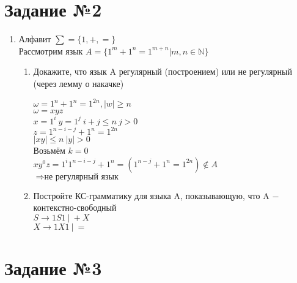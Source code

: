 \documentclass{article}
\begin{document}
    \section*{\huge{Задание №2}}
    
        \begin{enumerate}
            \LARGE
            \item Алфавит $\sum = \{ 1,+,= \}$ \\ Рассмотрим язык $A = \{ 1^m + 1^n = 1^{m+n}|m,n \in \mathbb{N} \}$
                \begin{enumerate}
                    \item Докажите, что язык A регулярный (построением) или не регулярный (через лемму о накачке) \\
                    
                        \begin{center}
                            $\omega = 1^n + 1^n = 1^{2n}, |w| \geq n$ \\
                            $\omega = xyz$ \\
                            $x = 1^i \  y = 1^j \  i + j \leq n \  j > 0$ \\
                            $z = 1^{n-i-j} + 1^n = 1^{2n}$ \\
                            $|xy| \leq n \  |y| > 0$ \\
                            Возьмём $k = 0$ \\
                            $xy^0z = 1^i 1^{n-i-j} + 1^n = (1^{n-j} + 1^n = 1^{2n}) \notin A$ \\
                            $\Rightarrow \textbf{не регулярный язык}$
                        \end{center}
                        
                    \item Постройте КС-грамматику для языка A, показывающую, что A $ - $ контекстно-свободный \\
                    
                        $S \rightarrow 1S1 \ | \ +X$ \\
                        $X \rightarrow 1X1 \ | \ =$ \\
                \end{enumerate}
        \end{enumerate}

    \section*{\huge{Задание №3}}
    
\end{document}
